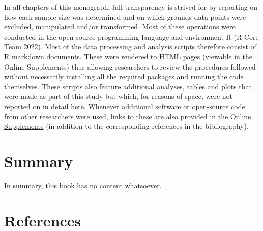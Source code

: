 \documentclass[
  letterpaper,
  DIV=11,
  numbers=noendperiod]{scrreprt}
\begin{document}
In all chapters of this monograph, full transparency is strived for by
reporting on how each sample size was determined and on which grounds
data points were excluded, manipulated and/or transformed. Most of these
operations were conducted in the open-source programming language and
environment R (R Core Team 2022). Most of the data processing and
analysis scripts therefore consist of R markdown documents. These were
rendered to HTML pages (viewable in the Online Supplements) thus
allowing researchers to review the procedures followed without
necessarily installing all the required packages and running the code
themselves. These scripts also feature additional analyses, tables and
plots that were made as part of this study but which, for reasons of
space, were not reported on in detail here. Whenever additional software
or open-source code from other researchers were used, links to these are
also provided in the
\href{https://elenlefoll.github.io/TextbookMDA}{Online Supplements} (in
addition to the corresponding references in the bibliography).


\chapter{Summary}\label{summary}

In summary, this book has no content whatsoever.


\chapter*{References}\label{references}

\end{document}
